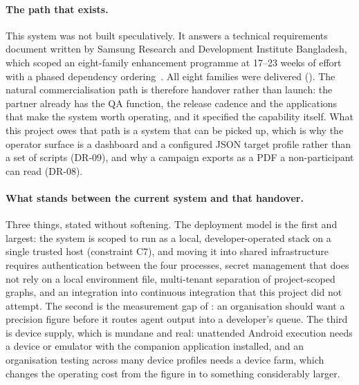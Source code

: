 \paragraph{The path that exists.} This system was not built speculatively. It
answers a technical requirements document written by Samsung Research and
Development Institute Bangladesh, which scoped an eight-family enhancement
programme at 17--23 weeks of effort with a phased dependency
ordering~\cite{etatr}. All eight families were delivered
(). The natural commercialisation path is therefore
handover rather than launch: the partner already has the QA function, the
release cadence and the applications that make the system worth operating, and
it specified the capability itself. What this project owes that path is a
system that can be picked up, which is why the operator surface is a dashboard
and a configured JSON target profile rather than a set of scripts (DR-09), and
why a campaign exports as a PDF a non-participant can read (DR-08).

\paragraph{What stands between the current system and that handover.} Three
things, stated without softening. The deployment model is the first and
largest: the system is scoped to run as a local, developer-operated stack on a
single trusted host (constraint C7), and moving it into shared infrastructure
requires authentication between the four processes, secret management that does
not rely on a local environment file, multi-tenant separation of project-scoped
graphs, and an integration into continuous integration that this project did
not attempt. The second is the measurement gap of : an
organisation should want a precision figure before it routes agent output into
a developer's queue. The third is device supply, which is mundane and real:
unattended Android execution needs a device or emulator with the companion
application installed, and an organisation testing across many device profiles
needs a device farm, which changes the operating cost from the figure in
 to something considerably larger.

